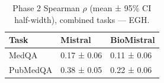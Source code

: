 \begin{table}
\caption{Phase 2 Spearman $\rho$ (mean ± 95\% CI half-width), combined tasks — EGH.}
\label{tab:phase2_spearman_all_egh_probe_oof}
\begin{tabular}{lll}
\toprule
Task & Mistral & BioMistral \\
\midrule
MedQA & 0.17 ± 0.06 & 0.11 ± 0.06 \\
PubMedQA & 0.38 ± 0.05 & 0.22 ± 0.06 \\
\bottomrule
\end{tabular}
\end{table}

